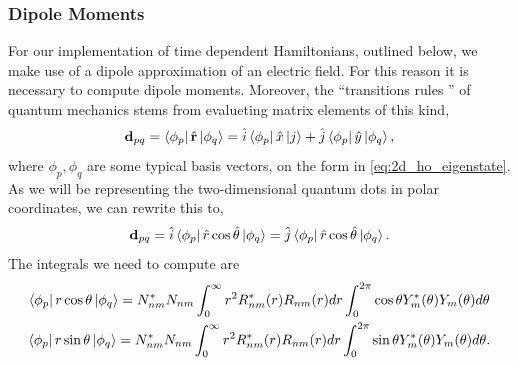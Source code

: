 \subsubsection{Dipole Moments}
For our implementation of time dependent Hamiltonians, outlined below, we make use of 
a dipole approximation of an electric field. For this reason it is necessary to compute 
dipole moments. Moreover, the ``transitions rules
'' of quantum mechanics stems from evalueting matrix elements of this kind,
\begin{equation}
    \vb{d}_{pq} = \bra{\phi_p} \hat{\vb{r}} \ket{\phi_q} 
        = \hat{i}\bra{\phi_p} \hat{x} \ket{j} + \hat{j}  \bra{\phi_p} \hat{y} \ket{\phi_q},
\end{equation}
where $\phi_p, \phi_q$ are some typical basis vectors, on the form in \autoref{eq:2d_ho_eigenstate}.
As we will be representing the two-dimensional quantum dots in polar coordinates,
we can rewrite this to,
\begin{equation}
    \vb{d}_{pq} 
        = \hat{i}\bra{\phi_p} \hat{r}\cos{\hat{\theta}}\ket{\phi_q}
        = \hat{j}\bra{\phi_p} \hat{r}\cos{\hat{\theta}}\ket{\phi_q}.
\end{equation}
The integrals we need to compute are
\begin{gather}
    \bra{\phi_p} r \cos\theta \ket{\phi_q} 
        = 
        N_{nm}^* N_{nm} 
        \int_0^\infty r^2 R^*_{nm}(r)R_{nm}(r) dr
        \int_0^{2\pi} \cos\theta Y^*_{m}(\theta)Y_{m}(\theta)d\theta \\
    \bra{\phi_p} r \sin\theta \ket{\phi_q} 
        = 
        N_{nm}^* N_{nm} 
        \int_0^\infty r^2 R^*_{nm}(r)R_{nm}(r) dr
        \int_0^{2\pi} \sin\theta Y^*_{m}(\theta)Y_{m}(\theta)d\theta.
\end{gather}

